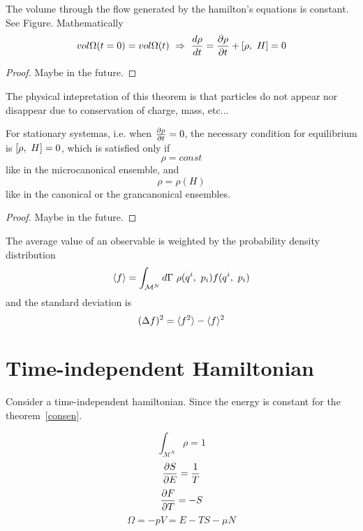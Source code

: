     \begin{theorem}[Liouville]
        The volume through the flow generated by the hamilton's equations is constant. See Figure. Mathematically
        \begin{equation*}
            vol \Omega(t=0) = vol \Omega(t) ~\Rightarrow~ \frac{d\rho}{dt} = \frac{\partial\rho}{\partial t} + [\rho,~H] = 0
        \end{equation*}
    \end{theorem}

    \begin{proof}
        Maybe in the future.
    \end{proof}

    The physical intepretation of this theorem is that particles do not appear nor disappear due to conservation of charge, mass, etc...

    For stationary systemas, i.e. when $\frac{\partial\rho}{\partial t} = 0$, the necessary condition for equilibrium is $[\rho,~H] = 0$, which is satisfied only if 
    \begin{equation*}
        \rho = const 
    \end{equation*}
    like in the microcanonical ensemble, and 
    \begin{equation*}
        \rho = \rho(H)
    \end{equation*}
    like in the canonical or the grancanonical ensembles.

    \begin{proof}
        Maybe in the future.
    \end{proof}

    The average value of an observable is weighted by the probability density distribution
    \begin{equation*}
        \langle f\rangle = \int_{\mathcal M^N} d\Gamma ~ \rho(q^i, ~p_i) f(q^i, ~p_i)
    \end{equation*}
    and the standard deviation is 
    \begin{equation*}
        (\Delta f)^2 = \langle f^2\rangle - \langle f\rangle^2
    \end{equation*}

\section{Time-independent Hamiltonian}

    Consider a time-independent hamiltonian. Since the energy is constant for the theorem~\ref{consen}.

    \begin{equation}\label{norm}
        \int_{\mathcal M^N} \rho = 1
    \end{equation}
    \begin{equation}\label{T}
        \frac{\partial S}{\partial E} = \frac{1}{T}
    \end{equation}
    \begin{equation}\label{F}
        \frac{\partial F}{\partial T} = - S
    \end{equation}
    \begin{equation}\label{OM}
        \Omega = - pV = E - TS - \mu N
    \end{equation}

